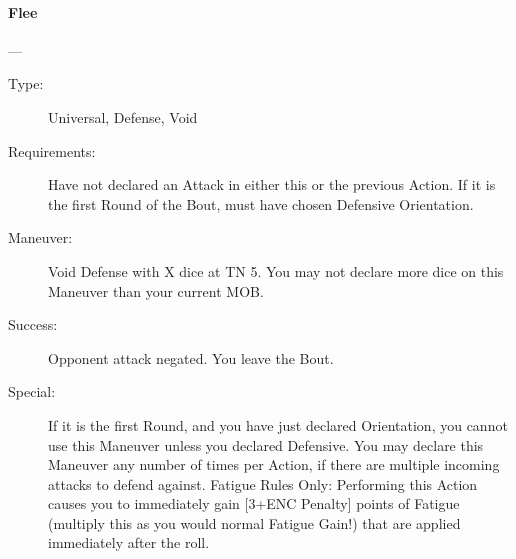 \documentclass[oneside,11pt,english]{book}
\begin{document}
\paragraph{\large\label{man:Flee}Flee}---
\vspace{-10pt}\begin{description} 
\item [Type:] Universal, Defense, Void 
\item [Requirements:] Have not declared an Attack in either this or the previous Action. If it is the first Round 
of the Bout, must have chosen Defensive Orientation. 
\item [Maneuver:] Void Defense with X dice at TN 5. You may not declare more dice on this Maneuver than 
your current MOB. 
\item [Success:] Opponent attack negated. You leave the Bout. 
\item [Special:] If it is the first Round, and you have just declared Orientation, you cannot use this Maneuver 
unless you declared Defensive. 
You may declare this Maneuver any number of times per Action, if there are multiple incoming attacks to 
defend against. 
Fatigue Rules Only: Performing this Action causes you to immediately gain [3+ENC Penalty] points of 
Fatigue (multiply this as you would normal Fatigue Gain!) that are applied immediately after the roll. 
\end{description}
\end{document}
